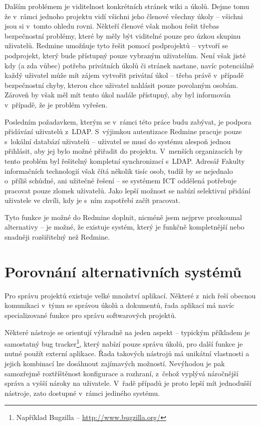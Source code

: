 \documentclass[thesis=B,czech]{FITthesis}[2012/05/02]
\begin{document}
Dalším problémem je viditelnost konkrétních stránek wiki a úkolů. Dejme
tomu že v~rámci jednoho projektu vidí všichni jeho členové všechny
úkoly -- všichni jsou si v~tomto ohledu rovni. Někteří
členové však mohou řešit třebas bezpečnostní problémy,
které by měly být viditelné pouze pro úzkou skupinu uživatelů. Redmine
umožňuje tyto  řešit pomocí podprojektů --
vytvoří se podprojekt, který bude přístupný pouze vybraným uživatelům.
Není však jisté kdy (a zda vůbec) potřeba privátních úkolů či stránek
nastane, navíc potenciálně každý uživatel může mít zájem vytvořit
privátní úkol -- třeba právě v~případě bezpečnostní chyby, kterou chce
uživatel nahlásit pouze povolaným osobám. Zároveň by však měl mít tento
úkol nadále přístupný, aby byl informován v~případě, že je problém
vyřešen.

Posledním požadavkem, kterým se v~rámci této práce budu zabývat, je
podpora přidávání uživatelů z~\gls{LDAP}. S~výjimkou autentizace Redmine
pracuje pouze s~lokální databází uživatelů -- uživatel se musí do
systému alespoň jednou přihlásit, aby jej bylo možné přiřadit do
projektu. V~menších organizacích by tento problém byl řešitelný
kompletní synchronizací s~\gls{LDAP}. Adresář Fakulty informačních
technologií však čítá několik tisíc osob, tudíž by se nejednalo o~příliš
schůdné, ani užitečné řešení -- se systémem ICT oddělená potřebuje
pracovat pouze zlomek uživatelů. Jako lepší možnost se nabízí selektivní
přidání uživatele ve chvíli, kdy je s~ním zapotřebí začít pracovat.

Tyto funkce je možné do Redmine doplnit, nicméně jsem nejprve prozkoumal
alternativy -- je možné, že existuje systém, který je funkčně
kompletnější nebo snadněji rozšiřitelný než Redmine.

\chapter{Porovnání alternativních systémů}

Pro správu projektů existuje velké množství aplikací. Některé z~nich
řeší obecnou komunikaci v~týmu se správou úkolů a dokumentů, řada
aplikací má navíc specializované funkce pro správu softwarových
projektů.

Některé nástroje se orientují výhradně na jeden aspekt -- typickým
příkladem je samostatný \gls{bug tracker}\footnote{Například Bugzilla --
  \url{http://www.bugzilla.org/}}, který nabízí pouze správu úkolů, pro
další funkce je nutné použít externí aplikace. Řada takových nástrojů má
unikátní vlastnosti a jejich kombinací lze dosáhnout zajímavých
možností. Nevýhodou je pak samozřejmě roztříštěnost konfigurace a
rozhraní, z~čehož vyplývá náročnější správa a vyšší nároky na uživatele.
V~řadě případů je proto lepší mít jednodušší nástroje, zato dostupné
v~rámci jediného systému.
\end{document}
